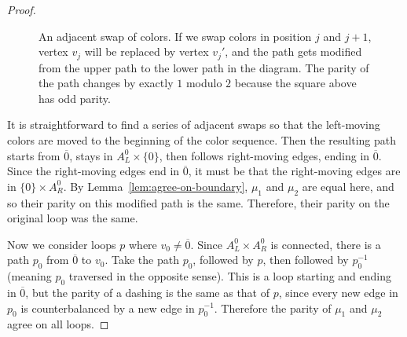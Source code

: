 \documentclass[12pt,twoside,singlespace]{article}
\numberwithin{equation}{section}
\theoremstyle{definition}
\begin{document}
\begin{proof}
\begin{figure}
\begin{center}
\end{center}
\caption{An adjacent swap of colors.  If we swap colors in position $j$ and $j+1$, vertex $v_j$ will be replaced by vertex $v_j{}'$, and the path gets modified from the upper path to the lower path in the diagram.  The parity of the path changes by exactly $1$ modulo $2$ because the square above has odd parity.
\label{fig:colorswap}}
\end{figure}

It is straightforward to find a series of adjacent swaps so that the left-moving colors are moved to the beginning of the color sequence.  Then the resulting path starts from $\overline{0}$, stays in $A_L^0\times\{0\}$, then follows right-moving edges, ending in $\overline{0}$.  Since the right-moving edges end in $\overline{0}$, it must be that the right-moving edges are in $\{0\}\times A_R^0$.  By Lemma~\ref{lem:agree-on-boundary}, $\mu_1$ and $\mu_2$ are equal here, and so their parity on this modified path is the same.  Therefore, their parity on the original loop was the same.

Now we consider loops $p$ where $v_0\not=\overline{0}$.  Since $A_L^0\times A_R^0$ is connected, there is a path $p_0$ from $\overline{0}$ to $v_0$.  Take the path $p_0$, followed by $p$, then followed by $p_0^{-1}$ (meaning $p_0$ traversed in the opposite sense).  This is a loop starting and ending in $\overline{0}$, but the parity of a dashing is the same as that of $p$, since every new edge in $p_0$ is counterbalanced by a new edge in $p_0^{-1}$.  Therefore the parity of $\mu_1$ and $\mu_2$ agree on all loops.
\end{proof}
\end{document}
